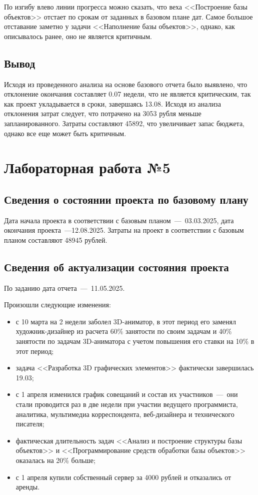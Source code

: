 По изгибу влево линии прогресса можно сказать, что веха <<Построение базы объектов>> отстает по срокам от заданных в базовом плане дат.
Самое большое отставание заметно у задачи <<Наполнение базы объектов>>, однако, как описывалось ранее, оно не является критичным.

\subsection*{Вывод}

Исходя из проведенного анализа на основе базового отчета было выявлено, что отклонение окончания составляет 0.07 недели, что не является критическим, так как проект укладывается в сроки, завершаясь 13.08.
Исходя из анализа отклонения затрат следует, что потрачено на 3053 рубля меньше запланированного. 
Затраты составляют 45892, что увеличивает запас бюджета, однако все еще может быть критичным.

\section{Лабораторная работа №5}

\subsection{Сведения о состоянии проекта по базовому плану}

Дата начала проекта в соответствии с базовым планом~---~03.03.2025, дата окончания проекта~---12.08.2025.
Затраты на проект в соответствии с базовым планом составляют 48945 рублей. 

\subsection{Сведения об актуализации состояния проекта}

По заданию дата отчета~---~11.05.2025.

Произошли следующие изменения:

\begin{itemize}[label=---]
	\item с 10 марта на 2 недели заболел 3D-аниматор, в этот период его заменял художник-дизайнер из расчета 60\% занятости по своим задачам и 40\% занятости по задачам 3D-аниматора с учетом повышения его ставки на 10\% в этот период;
	\item задача <<Разработка 3D графических элементов>> фактически завершилась 19.03;
	\item с 1 апреля изменился график совещаний и состав их участников~---~они стали проводится раз в две недели при участии ведущего программиста, аналитика, мультимедиа корреспондента, веб-дизайнера и технического писателя;
	\item фактическая длительность задач <<Анализ и построение структуры базы объектов>> и <<Программирование средств обработки базы объектов>> оказалась на 20\% больше;
	\item с 1 апреля купили собственный сервер за 4000 рублей и отказались от аренды.
\end{itemize}

